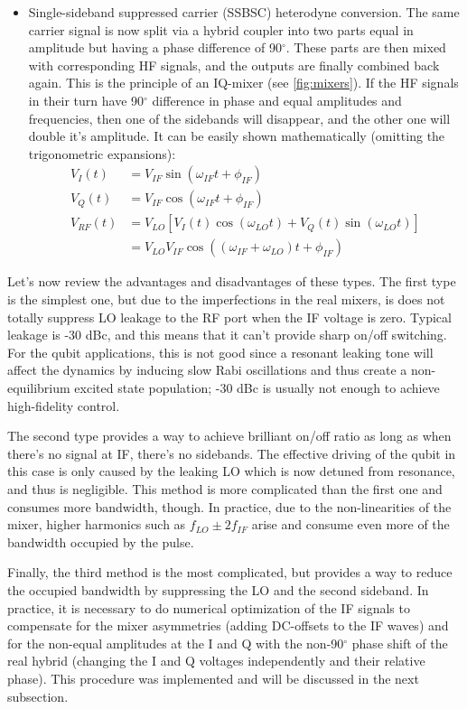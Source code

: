 \begin{itemize}[topsep=5pt, itemsep=5pt]
\item Single-sideband suppressed carrier (SSBSC) heterodyne conversion. The same carrier signal is now split via a hybrid coupler into two parts equal in amplitude but having a phase difference of 90$^\circ$. These parts are then mixed with corresponding HF signals, and the outputs are finally combined back again. This is the principle of an IQ-mixer (see \autoref{fig:mixers}). If the HF signals in their turn have 90$^\circ$ difference in phase and equal amplitudes and frequencies, then one of the sidebands will disappear, and the other one will double it's amplitude. It can be easily shown mathematically (omitting the trigonometric expansions):
\[
\begin{aligned}
V_I(t) &= V_{IF}\sin(\omega_{IF} t+ \phi_{IF})\\
V_Q(t) &= V_{IF}\cos(\omega_{IF} t+ \phi_{IF})\\
V_{RF}(t) &= V_{LO} [V_I(t)\cos(\omega_{LO}t)+V_Q(t)\sin(\omega_{LO}t)]  \\
&= V_{LO} V_{IF} \cos((\omega_{IF}+\omega_{LO})t+\phi_{IF} )
\end{aligned}
\]
\end{itemize}
%

Let's now review the advantages and disadvantages of these types. The first type is the simplest one, but due to the imperfections in the real mixers, is does not totally suppress LO leakage to the RF port when the IF voltage is zero. Typical leakage is -30 dBc, and this means that it can't provide sharp on/off switching. For the qubit applications, this is not good since a resonant leaking tone will affect the dynamics by inducing slow Rabi oscillations and thus create a non-equilibrium excited state population; -30 dBc is usually not enough to achieve high-fidelity control.

The second type provides a way to achieve brilliant on/off ratio as long as when there's no signal at IF, there's no sidebands. The effective driving of the qubit in this case is only caused by the leaking LO which is now detuned from resonance, and thus is negligible. This method is more complicated than the first one and consumes more bandwidth, though.  In practice, due to the non-linearities of the mixer, higher harmonics such as $f_{LO} \pm 2 f_{IF}$ arise and consume even more of the bandwidth occupied by the pulse.

Finally, the third method is the most complicated, but provides a way to reduce the occupied bandwidth by suppressing the LO and the second sideband. In practice, it is necessary to do numerical optimization of the IF signals to compensate for the mixer asymmetries (adding DC-offsets to the IF waves) and for the non-equal amplitudes at the I and Q with the non-90$^\circ$ phase shift of the real hybrid (changing the I and Q voltages independently and their relative phase). This procedure was implemented and will be discussed in the next subsection.

